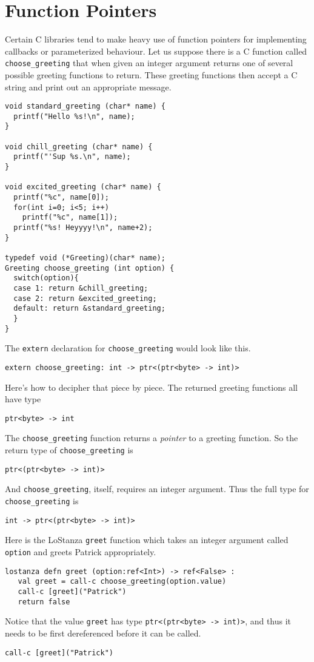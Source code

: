 \documentclass[10pt,oneside]{book}
\begin{document}
\section{Function Pointers}
Certain C libraries tend to make heavy use of function pointers for implementing callbacks or parameterized behaviour. Let us suppose there is a C function called \texttt{\frenchspacing choose\_greeting} that when given an integer argument returns one of several possible greeting functions to return. These greeting functions then accept a C string and print out an appropriate message.
\begin{lstlisting}
void standard_greeting (char* name) {
  printf("Hello %s!\n", name);
}

void chill_greeting (char* name) {
  printf("'Sup %s.\n", name);
}

void excited_greeting (char* name) {
  printf("%c", name[0]);
  for(int i=0; i<5; i++)
    printf("%c", name[1]);
  printf("%s! Heyyyy!\n", name+2);    
}

typedef void (*Greeting)(char* name);
Greeting choose_greeting (int option) {
  switch(option){
  case 1: return &chill_greeting;
  case 2: return &excited_greeting;
  default: return &standard_greeting;
  }
}
\end{lstlisting}

The \texttt{\frenchspacing extern} declaration for \texttt{\frenchspacing choose\_greeting} would look like this.
\begin{lstlisting}
extern choose_greeting: int -> ptr<(ptr<byte> -> int)>
\end{lstlisting}
Here's how to decipher that piece by piece. The returned greeting functions all have type
\begin{lstlisting}
ptr<byte> -> int
\end{lstlisting}
The \texttt{\frenchspacing choose\_greeting} function returns a {\em pointer} to a greeting function. So the return type of \texttt{\frenchspacing choose\_greeting} is
\begin{lstlisting}
ptr<(ptr<byte> -> int)>
\end{lstlisting}
And \texttt{\frenchspacing choose\_greeting}, itself, requires an integer argument. Thus the full type for \texttt{\frenchspacing choose\_greeting} is
\begin{lstlisting}
int -> ptr<(ptr<byte> -> int)>
\end{lstlisting}

Here is the LoStanza \texttt{\frenchspacing greet} function which takes an integer argument called \texttt{\frenchspacing option} and greets Patrick appropriately.
\begin{lstlisting}
lostanza defn greet (option:ref<Int>) -> ref<False> :
   val greet = call-c choose_greeting(option.value)
   call-c [greet]("Patrick")
   return false
\end{lstlisting}
Notice that the value \texttt{\frenchspacing greet} has type \texttt{\frenchspacing ptr<(ptr<byte> -> int)>}, and thus it needs to be first dereferenced before it can be called.
\begin{lstlisting}
call-c [greet]("Patrick")
\end{lstlisting}
\end{document}

